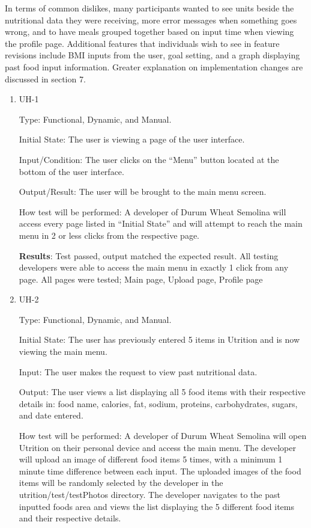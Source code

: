 \documentclass[12pt, titlepage]{article}
\begin{document}
	In terms of common dislikes, many participants wanted to see units beside the nutritional data they were receiving, more error messages when something goes wrong, and to have meals grouped together based on input time when viewing the profile page. Additional features that individuals wish to see in feature revisions include BMI inputs from the user, goal setting, and a graph displaying past food input information. Greater explanation on implementation changes are discussed in section 7.
	
	\begin{enumerate}
		
		\item{UH-1}
		
		Type: Functional, Dynamic, and Manual.
		
		Initial State: The user is viewing a page of the user interface.
		
		Input/Condition: The user clicks on the “Menu” button located at the bottom of the user interface.
		
		Output/Result: The user will be brought to the main menu screen.
		
		How test will be performed: A developer of Durum Wheat Semolina will access every page listed in “Initial State” and will attempt to reach the main menu in 2 or less clicks from the respective page.
		
		\textbf{Results}: Test passed, output matched the expected result. All testing developers were able to access the main menu in exactly 1 click from any page. All pages were tested; Main page, Upload page, Profile page
		
		
		\item{UH-2}
		
		Type: Functional, Dynamic, and Manual.
		
		Initial State: The user has previously entered 5 items in Utrition and is now viewing the main menu.
		
		Input: The user makes the request to view past nutritional data.
		
		Output: The user views a list displaying all 5 food items with their respective details in: food name, calories, fat, sodium, proteins, carbohydrates, sugars, and date entered.
		
		How test will be performed: A developer of Durum Wheat Semolina will open Utrition on their personal device and access the main menu. The developer will upload an image of different food items 5 times, with a minimum 1 minute time difference between each input. The uploaded images of the food items will be randomly selected by the developer in the utrition/test/testPhotos directory. The developer navigates to the past inputted foods area and views the list displaying the 5 different food items and their respective details.
		

\end{enumerate}
\end{document}
